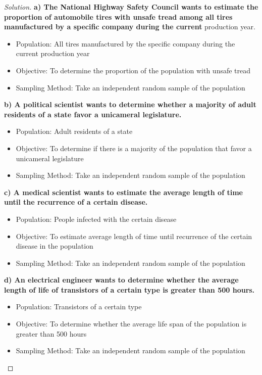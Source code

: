 \documentclass[10pt]{article}
\newenvironment{solution}{\begin{proof}[Solution]}{\end{proof}}
\begin{document}
	
	\begin{solution}\quad\newline
	\textbf{a) The National Highway Safety Council wants to estimate the proportion of automobile tires with unsafe tread among all tires manufactured by a specific company during the current}
production year.
	\begin{itemize}
	\item Population: All tires manufactured by the specific company during the current production year
	\item Objective: To determine the proportion of the population with unsafe tread
	\item Sampling Method: Take an independent random sample of the population
	\end{itemize}
		\textbf{b) A political scientist wants to determine whether a majority of adult residents of a state favor
a unicameral legislature.}
	\begin{itemize}
	\item Population: Adult residents of a state
	\item Objective: To determine if there is a majority of the population that favor a unicameral legislature
	\item Sampling Method: Take an independent random sample of the population
	\end{itemize}
		\textbf{c) A medical scientist wants to estimate the average length of time until the recurrence of a certain disease.}
	\begin{itemize}
	\item Population: People infected with the certain disease
	\item Objective: To estimate average length of time until recurrence of the certain disease in the population
	\item Sampling Method: Take an independent random sample of the population
	\end{itemize}
		\textbf{d) An electrical engineer wants to determine whether the average length of life of transistors of a certain type is greater than 500 hours.}
	\begin{itemize}
	\item Population: Transistors of a certain type 
	\item Objective:  To determine whether the average life span of the population is greater than 500 hours
	\item Sampling Method: Take an independent random sample of the population
	\end{itemize}

\end{solution}
\end{document}
